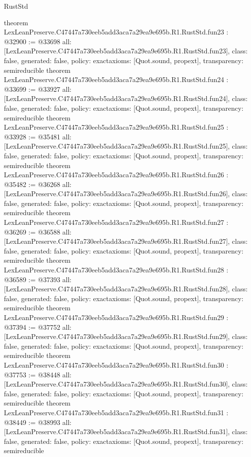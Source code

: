 \begin{lexlean}{RustStd}
\begin{coremodule}
{}
theorem LexLeanPreserve.C47447a730eeb5add3aca7a29ea9e695b.R1.RustStd.fun23 : @32900 := @33698 {
  all: [LexLeanPreserve.C47447a730eeb5add3aca7a29ea9e695b.R1.RustStd.fun23],
  class: false,
  generated: false,
  policy: exact{axioms: [Quot.sound, propext]},
  transparency: semireducible
}
theorem LexLeanPreserve.C47447a730eeb5add3aca7a29ea9e695b.R1.RustStd.fun24 : @33699 := @33927 {
  all: [LexLeanPreserve.C47447a730eeb5add3aca7a29ea9e695b.R1.RustStd.fun24],
  class: false,
  generated: false,
  policy: exact{axioms: [Quot.sound, propext]},
  transparency: semireducible
}
theorem LexLeanPreserve.C47447a730eeb5add3aca7a29ea9e695b.R1.RustStd.fun25 : @33928 := @35481 {
  all: [LexLeanPreserve.C47447a730eeb5add3aca7a29ea9e695b.R1.RustStd.fun25],
  class: false,
  generated: false,
  policy: exact{axioms: [Quot.sound, propext]},
  transparency: semireducible
}
theorem LexLeanPreserve.C47447a730eeb5add3aca7a29ea9e695b.R1.RustStd.fun26 : @35482 := @36268 {
  all: [LexLeanPreserve.C47447a730eeb5add3aca7a29ea9e695b.R1.RustStd.fun26],
  class: false,
  generated: false,
  policy: exact{axioms: [Quot.sound, propext]},
  transparency: semireducible
}
theorem LexLeanPreserve.C47447a730eeb5add3aca7a29ea9e695b.R1.RustStd.fun27 : @36269 := @36588 {
  all: [LexLeanPreserve.C47447a730eeb5add3aca7a29ea9e695b.R1.RustStd.fun27],
  class: false,
  generated: false,
  policy: exact{axioms: [Quot.sound, propext]},
  transparency: semireducible
}
theorem LexLeanPreserve.C47447a730eeb5add3aca7a29ea9e695b.R1.RustStd.fun28 : @36589 := @37393 {
  all: [LexLeanPreserve.C47447a730eeb5add3aca7a29ea9e695b.R1.RustStd.fun28],
  class: false,
  generated: false,
  policy: exact{axioms: [Quot.sound, propext]},
  transparency: semireducible
}
theorem LexLeanPreserve.C47447a730eeb5add3aca7a29ea9e695b.R1.RustStd.fun29 : @37394 := @37752 {
  all: [LexLeanPreserve.C47447a730eeb5add3aca7a29ea9e695b.R1.RustStd.fun29],
  class: false,
  generated: false,
  policy: exact{axioms: [Quot.sound, propext]},
  transparency: semireducible
}
theorem LexLeanPreserve.C47447a730eeb5add3aca7a29ea9e695b.R1.RustStd.fun30 : @37753 := @38448 {
  all: [LexLeanPreserve.C47447a730eeb5add3aca7a29ea9e695b.R1.RustStd.fun30],
  class: false,
  generated: false,
  policy: exact{axioms: [Quot.sound, propext]},
  transparency: semireducible
}
theorem LexLeanPreserve.C47447a730eeb5add3aca7a29ea9e695b.R1.RustStd.fun31 : @38449 := @38993 {
  all: [LexLeanPreserve.C47447a730eeb5add3aca7a29ea9e695b.R1.RustStd.fun31],
  class: false,
  generated: false,
  policy: exact{axioms: [Quot.sound, propext]},
  transparency: semireducible
}
\end{coremodule}
\end{lexlean}
